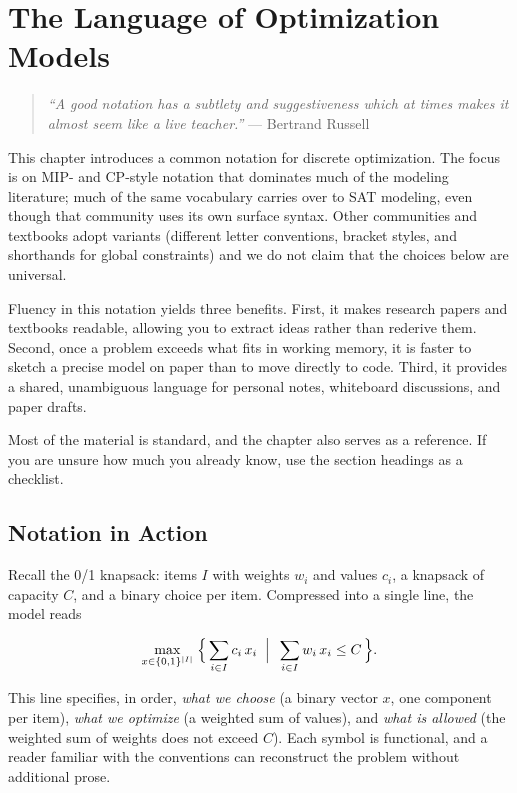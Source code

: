 \chapter{The Language of Optimization Models}\label{chap:2}

\begin{quote}
\emph{``A good notation has a subtlety and suggestiveness which at times
makes it almost seem like a live teacher.''} --- Bertrand Russell
\end{quote}

This chapter introduces a common notation for discrete optimization. The
focus is on MIP- and CP-style notation that dominates much of the
modeling literature; much of the same vocabulary carries over to SAT
modeling, even though that community uses its own surface syntax. Other
communities and textbooks adopt variants (different letter
conventions, bracket styles, and shorthands for global constraints)
and we do not claim that the choices below are universal.

Fluency in this notation yields three benefits. First, it makes research
papers and textbooks readable, allowing you to extract ideas rather than
rederive them. Second, once a problem exceeds what fits in working
memory, it is faster to sketch a precise model on paper than to move
directly to code. Third, it provides a shared, unambiguous language for
personal notes, whiteboard discussions, and paper drafts.

Most of the material is standard, and the chapter also serves as a
reference. If you are unsure how much you already know, use the section
headings as a checklist.

\section{Notation in Action}\label{sec:2.1}

Recall the 0/1 knapsack: items \(I\) with weights \(w_i\) and values
\(c_i\), a knapsack of capacity \(C\), and a binary choice per item.
Compressed into a single line, the model reads

\[
\max_{x \in \{0,1\}^{|I|}} \;\Bigl\{\, \sum_{i \in I} c_i\, x_i \;\;\Big|\;\; \sum_{i \in I} w_i\, x_i \le C \,\Bigr\}.
\]

This line specifies, in order, \emph{what we choose} (a binary vector
\(x\), one component per item), \emph{what we optimize} (a weighted sum
of values), and \emph{what is allowed} (the weighted sum of weights
does not exceed \(C\)). Each symbol is functional, and a reader
familiar with the conventions can reconstruct the problem without
additional prose.

